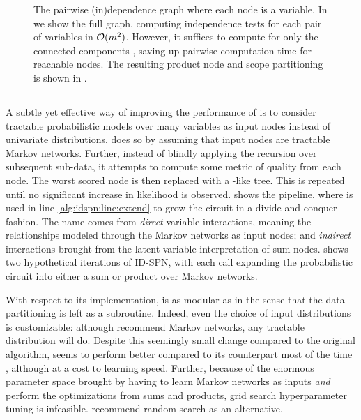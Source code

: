 \begin{figure}[t]
\begin{subfigure}[t]{0.3\textwidth}
    \caption{}
  \end{subfigure}
  \caption{The pairwise (in)dependence graph where each node is a variable. In  we
    show the full graph, computing independence tests for each pair of variables in $\mathcal{O}(m^2)$.
    However, it suffices to compute for only the connected components , saving up
    pairwise computation time for reachable nodes.  The resulting product node and scope
    partitioning is shown in .}
  \label{fig:indepgraph}
\end{figure}

\subsection{}
\label{sec:idspn}

A subtle yet effective way of improving the performance of  is to consider
tractable probabilistic models over many variables as input nodes instead of univariate
distributions.  \citep{rooshenas14} does so by assuming that input nodes are
tractable Markov networks. Further, instead of blindly applying the recursion over subsequent
sub-data, it attempts to compute some metric of quality from each node. The worst scored node is
then replaced with a -like tree. This is repeated until no significant increase
in likelihood is observed.  shows the  pipeline, where
 is used in line \ref{alg:idspn:line:extend} to grow the circuit in a
divide-and-conquer fashion. The name  comes from \emph{direct} variable
interactions, meaning the relationships modeled through the Markov networks as input nodes; and
\emph{indirect} interactions brought from the latent variable interpretation of sum nodes.
 shows two hypothetical iterations of ID-SPN, with each call expanding the
probabilistic circuit into either a sum or product over Markov networks.

With respect to its implementation,  is as modular as  in the
sense that the data partitioning is left as a subroutine. Indeed, even the choice of input
distributions is customizable: although \citeauthor{rooshenas14} recommend Markov networks, any
tractable distribution will do. Despite this seemingly small change compared to the original
 algorithm,  seems to perform better compared to its
counterpart most of the time \citep{rooshenas14,jaini18a}, although at a cost to learning speed.
Further, because of the enormous parameter space brought by having to learn Markov networks as
inputs \emph{and} perform the optimizations from sums and products, grid search hyperparameter
tuning is infeasible. \citep{rooshenas14} recommend random search \citep{bergstra12a} as an
alternative.

